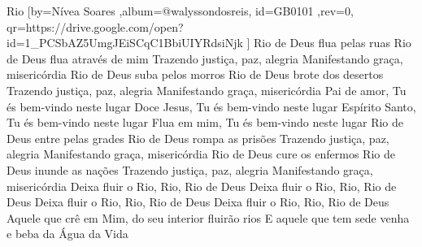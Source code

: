 \beginsong
{Rio %
}[by={Nívea Soares %
},album={@walyssondosreis},
id={GB0101 %
},rev={0}, %
qr={https://drive.google.com/open?id=1_PCSbAZ5UmgJEiSCqC1BbiUIYRdsiNjk %
}]
\beginverse*
Rio de Deus flua pelas ruas
Rio de Deus flua através de mim
Trazendo justiça, paz, alegria
Manifestando graça, misericórdia
\endverse
\beginverse*
Rio de Deus suba pelos morros
Rio de Deus brote dos desertos
Trazendo justiça, paz, alegria
Manifestando graça, misericórdia
\endverse
\beginchorus
Pai de amor, Tu és bem-vindo neste lugar
Doce Jesus, Tu és bem-vindo neste lugar
Espírito Santo, Tu és bem-vindo neste lugar
Flua em mim, Tu és bem-vindo neste lugar
\endchorus
\beginverse*
Rio de Deus entre pelas grades
Rio de Deus rompa as prisões
Trazendo justiça, paz, alegria
Manifestando graça, misericórdia
\endverse
\beginverse*
Rio de Deus cure os enfermos
Rio de Deus inunde as nações
Trazendo justiça, paz, alegria
Manifestando graça, misericórdia
\endverse
\beginverse*
Deixa fluir o Rio, Rio, Rio de Deus
Deixa fluir o Rio, Rio, Rio de Deus
Deixa fluir o Rio, Rio, Rio de Deus
Deixa fluir o Rio, Rio, Rio de Deus
\endverse
\beginverse*
Aquele que crê em Mim, do seu interior fluirão rios
E aquele que tem sede venha e beba da Água da Vida
\endverse

